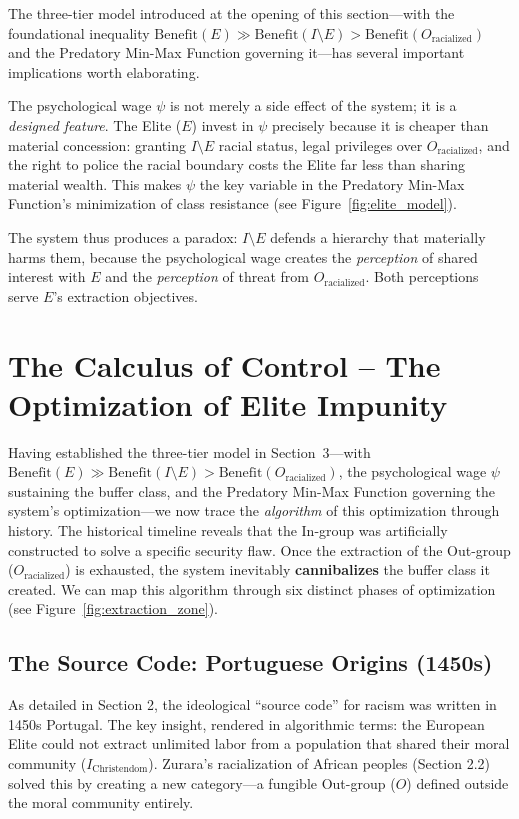 \documentclass[12pt]{article}
\begin{document}
The three-tier model introduced at the opening of this section---with the foundational inequality $\text{Benefit}(E) \gg \text{Benefit}(I \setminus E) > \text{Benefit}(O_{\text{racialized}})$ and the Predatory Min-Max Function governing it---has several important implications worth elaborating.

The psychological wage $\psi$ is not merely a side effect of the system; it is a \textit{designed feature}. The Elite ($E$) invest in $\psi$ precisely because it is cheaper than material concession: granting $I \setminus E$ racial status, legal privileges over $O_{\text{racialized}}$, and the right to police the racial boundary costs the Elite far less than sharing material wealth. This makes $\psi$ the key variable in the Predatory Min-Max Function's minimization of class resistance (see Figure~\ref{fig:elite_model}).

The system thus produces a paradox: $I \setminus E$ defends a hierarchy that materially harms them, because the psychological wage creates the \textit{perception} of shared interest with $E$ and the \textit{perception} of threat from $O_{\text{racialized}}$. Both perceptions serve $E$'s extraction objectives.

\section{The Calculus of Control -- The Optimization of Elite Impunity}

Having established the three-tier model in Section~3---with $\text{Benefit}(E) \gg \text{Benefit}(I \setminus E) > \text{Benefit}(O_{\text{racialized}})$, the psychological wage $\psi$ sustaining the buffer class, and the Predatory Min-Max Function governing the system's optimization---we now trace the \textit{algorithm} of this optimization through history. The historical timeline reveals that the In-group was artificially constructed to solve a specific security flaw. Once the extraction of the Out-group ($O_{\text{racialized}}$) is exhausted, the system inevitably \textbf{cannibalizes} the buffer class it created. We can map this algorithm through six distinct phases of optimization (see Figure~\ref{fig:extraction_zone}).

\subsection{The Source Code: Portuguese Origins (1450s)}
As detailed in Section 2, the ideological ``source code'' for racism was written in 1450s Portugal. The key insight, rendered in algorithmic terms: the European Elite could not extract unlimited labor from a population that shared their moral community ($I_{\text{Christendom}}$). Zurara's racialization of African peoples (Section 2.2) solved this by creating a new category---a fungible Out-group ($O$) defined outside the moral community entirely.
\end{document}
